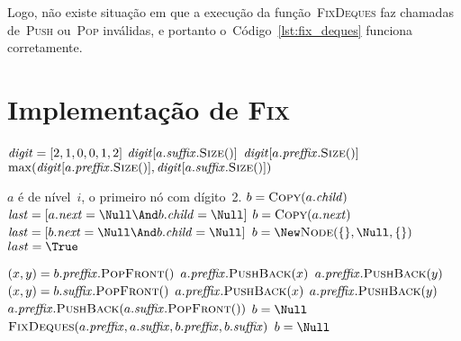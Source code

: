 \documentclass[../../main.tex]{subfiles}
\begin{document}
Logo, não existe situação em que a execução da função~\textsc{FixDeques} faz chamadas de~\textsc{Push} ou~\textsc{Pop} inválidas, e portanto o~Código~\ref{lst:fix_deques} funciona corretamente.

\section{Implementação de {\normalfont \textsc{Fix}}}

\begin{algorithm}
\begin{algorithmic}[1]

    \State $\mathit{digit} = [2, 1, 0, 0, 1, 2]$ 
        \State \Return $\V{digit}[a.\V{suffix}.\Call{Size}{\null}]$
        \State \Return $\V{digit}[a.\V{preffix}.\Call{Size}{\null}]$
    \Else
        \State \Return $\max(\V{digit}[a.\V{preffix}.\Call{Size}{\null}], \V{digit}[a.\V{suffix}.\Call{Size}{\null}])$
    \EndIf
\EndFunction

\Require $a$ é de nível~$i$, o primeiro nó com dígito~2.
     \label{line:fix:p1b}
        \State $b = \Call{Copy}{a.\V{child}}$
        \State $\V{last} = [a.\V{next} = \Null \And b.\V{child} = \Null]$
        \State $b = \Call{Copy}{a.\V{next}}$
        \State $\V{last} = [b.\V{next} = \Null \And b.\V{child} = \Null]$
    \Else
        \State $b = \New \Call{Node}{\{\}, \Null, \{\}}$  \label{line:fix:p1e}
        \State $last = \True$
    \EndIf
    
       \label{line:fix:p2b}
            \State $(x, y) = b.\V{preffix}.\Call{PopFront}{\null}$
            \State $a.\mathit{preffix}.\textsc{PushBack}(x)$
            \State $a.\mathit{preffix}.\textsc{PushBack}(y)$
        \EndIf
            \State $(x, y) = b.\V{suffix}.\Call{PopFront}{\null}$
            \State $a.\mathit{preffix}.\textsc{PushBack}(x)$
            \State $a.\mathit{preffix}.\textsc{PushBack}(y)$
        \EndIf
            \State $a.\V{preffix}.\textsc{PushBack}(a.\V{suffix}.\Call{PopFront}{\null})$
        \EndIf
        \State $b = \Null$  \label{line:fix:p2e}
    \Else {}  \label{line:fix:p3b}
        \State $\Call{FixDeques}{a.\V{preffix}, a.\V{suffix}, b.\V{preffix}, b.\V{suffix}}$
         \label{line:fix:if_empty}
            \State $b = \Null$  \label{line:fix:p3e}
        \EndIf
    \EndIf
    

\end{algorithmic}
\end{algorithm}
\end{document}
